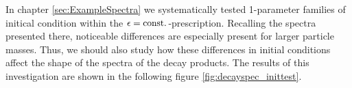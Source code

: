 In chapter \ref{sec:ExampleSpectra} we systematically tested 1-parameter families of initical condition within the ${\epsilon={\text{const.}}}$-prescription. Recalling the spectra presented there, noticeable differences are especially present for larger particle masses. Thus, we should also study how these differences in initial conditions affect the shape of the spectra of the decay products. The results of this investigation are shown in the following figure \ref{fig:decayspec_inittest}.\\\noindent
{}
